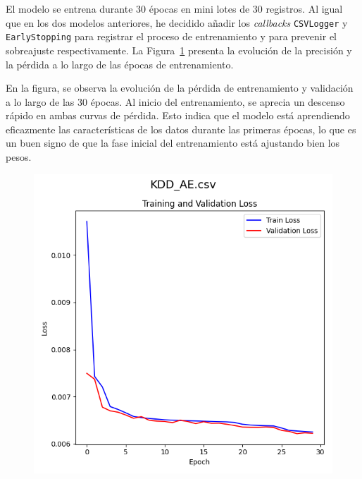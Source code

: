\begin{minipage}{0.6\textwidth}
    El modelo se entrena durante 30 épocas en mini lotes de 30 registros. Al igual que en los dos modelos anteriores, he decidido añadir los \textit{callbacks} \lstinline|CSVLogger| y \lstinline|EarlyStopping| para registrar el proceso de entrenamiento y para prevenir el sobreajuste respectivamente. La Figura~\ref{fig:trainingAE} presenta la evolución de la precisión y la pérdida a lo largo de las épocas de entrenamiento.

    \bigskip

    En la figura, se observa la evolución de la pérdida de entrenamiento y validación a lo largo de las 30 épocas. Al inicio del entrenamiento, se aprecia un descenso rápido en ambas curvas de pérdida. Esto indica que el modelo está aprendiendo eficazmente las características de los datos durante las primeras épocas, lo que es un buen signo de que la fase inicial del entrenamiento está ajustando bien los pesos.
\end{minipage}
\begin{minipage}{0.05\textwidth}
    \textbf{ }
\end{minipage}
\begin{minipage}{0.33\textwidth}
    
    \begin{figure}[H]
    \centering
    \includegraphics[width=\textwidth]{img/KDD_AE.csv.png}
    \label{fig:trainingAE}
    \end{figure}

\end{minipage}


